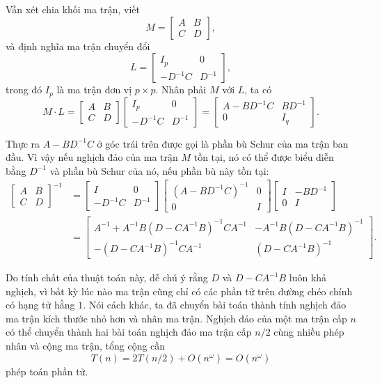 \documentclass[11pt]{article}
\begin{document}
Vẫn xét chia khối ma trận, viết
\[
  M=\begin{bmatrix}A&B\\C&D\end{bmatrix},
\]
và định nghĩa ma trận chuyển đổi
\[
  L=\begin{bmatrix}
  I_p & 0\\
  -D^{-1}C & D^{-1}
  \end{bmatrix},
\]
trong đó \(I_p\) là ma trận đơn vị \(p\times p\). Nhân phải \(M\) với \(L\), ta
có
\[
  M\cdot L=
  \begin{bmatrix}A&B\\C&D\end{bmatrix}
  \begin{bmatrix}I_p&0\\-D^{-1}C&D^{-1}\end{bmatrix}
  =
  \begin{bmatrix}A-BD^{-1}C&BD^{-1}\\0&I_q\end{bmatrix}.
\]

Thực ra \(A-BD^{-1}C\) ở góc trái trên được gọi là phần bù Schur của ma trận
ban đầu. Vì vậy nếu nghịch đảo của ma trận \(M\) tồn tại, nó có thể được biểu
diễn bằng \(D^{-1}\) và phần bù Schur của nó, nếu phần bù này tồn tại:
\[
\begin{aligned}
  \begin{bmatrix}A&B\\C&D\end{bmatrix}^{-1}
  &=
  \begin{bmatrix}I&0\\-D^{-1}C&D^{-1}\end{bmatrix}
  \begin{bmatrix}(A-BD^{-1}C)^{-1}&0\\0&I\end{bmatrix}
  \begin{bmatrix}I&-BD^{-1}\\0&I\end{bmatrix}\\
  &=
  \begin{bmatrix}
  A^{-1}+A^{-1}B(D-CA^{-1}B)^{-1}CA^{-1}
  & -A^{-1}B(D-CA^{-1}B)^{-1}\\
  -(D-CA^{-1}B)^{-1}CA^{-1}
  & (D-CA^{-1}B)^{-1}
  \end{bmatrix}.
\end{aligned}
\]

Do tính chất của thuật toán này, dễ chú ý rằng \(D\) và \(D-CA^{-1}B\) luôn khả
nghịch, vì bất kỳ lúc nào ma trận cũng chỉ có các phần tử trên đường chéo chính
có hạng tử hằng \(1\). Nói cách khác, ta đã chuyển bài toán thành tính nghịch
đảo ma trận kích thước nhỏ hơn và nhân ma trận. Nghịch đảo của một ma trận cấp
\(n\) có thể chuyển thành hai bài toán nghịch đảo ma trận cấp \(n/2\) cùng nhiều
phép nhân và cộng ma trận, tổng cộng cần
\[
  T(n)=2T(n/2)+O(n^\omega)=O(n^\omega)
\]
phép toán phần tử.
\end{document}
